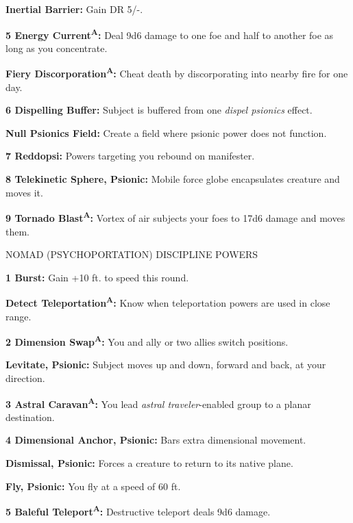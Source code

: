 \documentclass{article}
\begin{document}
\textbf{Inertial Barrier:} Gain DR 5/-.

\parindent=-15pt
\textbf{5 Energy Current}\textsuperscript{\textbf{A}}\textbf{: }Deal 9d6 damage 
to one foe and half to another foe as long as you concentrate.

\parindent=0pt
\textbf{Fiery Discorporation}\textsuperscript{\textbf{A}}\textbf{:} Cheat death 
by discorporating into nearby fire for one day.

\parindent=-15pt
\textbf{6 Dispelling Buffer:} Subject is buffered from one \textit{dispel psionics 
}effect.

\parindent=0pt
\textbf{Null Psionics Field:} Create a field where psionic power does not function.

\parindent=-15pt
\textbf{7 Reddopsi:} Powers targeting you rebound on manifester.

\textbf{8 Telekinetic Sphere, Psionic:} Mobile force globe encapsulates creature 
and moves it.

\textbf{9 Tornado Blast}\textsuperscript{\textbf{A}}\textbf{:} Vortex of air subjects 
your foes to 17d6 damage and moves them.

\vspace{12pt}
NOMAD (PSYCHOPORTATION) DISCIPLINE POWERS

\textbf{1 Burst:} Gain +10 ft. to speed this round.

\parindent=0pt
\textbf{Detect Teleportation}\textsuperscript{\textbf{A}}\textbf{:} Know when teleportation 
powers are used in close range.

\parindent=-15pt
\textbf{2 Dimension Swap}\textsuperscript{\textbf{A}}\textbf{:} You and ally or 
two allies switch positions.

\parindent=0pt
\textbf{Levitate, Psionic:} Subject moves up and down, forward and back, at your 
direction.

\parindent=-15pt
\textbf{3 Astral Caravan}\textsuperscript{\textbf{A}}\textbf{:} You lead \textit{astral 
traveler}-enabled group to a planar destination.

\textbf{4 Dimensional Anchor, Psionic:} Bars extra dimensional movement.

\parindent=0pt
\textbf{Dismissal, Psionic:} Forces a creature to return to its native plane.

\textbf{Fly, Psionic:} You fly at a speed of 60 ft.

\parindent=-15pt
\textbf{5 Baleful Teleport}\textsuperscript{\textbf{A}}\textbf{:} Destructive teleport 
deals 9d6 damage.
\end{document}
